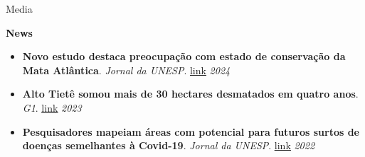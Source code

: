 \documentclass{resume}
\begin{document}
\begin{rSection}{Media}

{\bf News}
\begin{itemize} 
\item {\bf Novo estudo destaca preocupação com estado de conservação da Mata Atlântica}. {\it Jornal da UNESP}. \href{https://jornal.unesp.br/2024/03/15/novo-estudo-destaca-preocupacao-com-estado-de-conservacao-da-mata-atlantica/}{\underline{link}} \hfill{\em 2024}
\item {\bf Alto Tietê somou mais de 30 hectares desmatados em quatro anos}. {\it G1}. \href{https://g1.globo.com/sp/mogi-das-cruzes-suzano/noticia/2023/06/05/em-quatro-anos-alto-tiete-somou-mais-de-30-hectares-desmatados.ghtml}{\underline{link}} \hfill{\em 2023}
\item {\bf Pesquisadores mapeiam áreas com potencial para futuros surtos de doenças semelhantes à Covid-19}. {\it Jornal da UNESP}. \href{https://jornal.unesp.br/2022/06/23/pesquisadores-mapeiam-areas-com-potencial-para-futuros-surtos-de-doencas-semelhantes-a-covid-19/}{\underline{link}} \hfill{\em 2022}
\end{itemize} 


\end{rSection}
\end{document}
